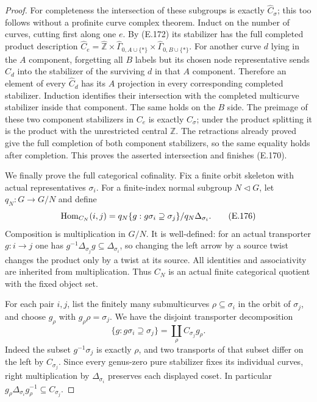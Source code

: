 \begin{proof}
For completeness the intersection of these subgroups is exactly
$\widehat C_\sigma$; this too follows without a profinite curve
complex theorem.  Induct on the number of curves, cutting first
along one $e$.  By (E.172) its stabilizer has the full completed
product description
$\widehat C_e=\widehat{\mathbb Z}\times
\widehat\Gamma_{0,A\cup\{*\}}\times
\widehat\Gamma_{0,B\cup\{*\}}$.
For another curve $d$ lying in the $A$ component, forgetting
all $B$ labels but its chosen node representative sends $C_d$
into the stabilizer of the surviving $d$ in that $A$ component.
Therefore an element of every $\widehat C_d$ has its $A$
projection in every corresponding completed stabilizer.
Induction identifies their intersection with the completed
multicurve stabilizer inside that component.  The same holds
on the $B$ side.  The preimage of these two component
stabilizers in $C_e$ is exactly $C_\sigma$; under the product
splitting it is the product with the unrestricted central
$\mathbb Z$.  The retractions already proved give the full
completion of both component stabilizers, so the same equality
holds after completion.  This proves the asserted intersection
and finishes (E.170).

We finally prove the full categorical cofinality.  Fix a finite
orbit skeleton with actual representatives $\sigma_i$.  For a
finite-index normal subgroup $N\lhd G$, let $q_N:G\to G/N$
and define
\[
 \operatorname{Hom}_{C_N}(i,j)=
   q_N\{g:g\sigma_i\supseteq\sigma_j\}/q_N\Delta_{\sigma_i}.
                                                               \tag{E.176}
\]
Composition is multiplication in $G/N$.  It is well-defined:
for an actual transporter $g:i\to j$ one has
$g^{-1}\Delta_{\sigma_j}g\subseteq\Delta_{\sigma_i}$, so
changing the left arrow by a source twist changes the product
only by a twist at its source.  All identities and associativity
are inherited from multiplication.  Thus $C_N$ is an actual
finite categorical quotient with the fixed object set.

For each pair $i,j$, list the finitely many submulticurves
$\rho\subseteq\sigma_i$ in the orbit of $\sigma_j$, and choose
$g_\rho$ with $g_\rho\rho=\sigma_j$.  We have the disjoint
transporter decomposition
\[
 \{g:g\sigma_i\supseteq\sigma_j\}
                 =\coprod_\rho C_{\sigma_j}g_\rho.            \tag{E.177}
\]
Indeed the subset $g^{-1}\sigma_j$ is exactly $\rho$, and two
transports of that subset differ on the left by
$C_{\sigma_j}$.  Since every genus-zero pure stabilizer fixes
its individual curves, right multiplication by
$\Delta_{\sigma_i}$ preserves each displayed coset.  In
particular $g_\rho\Delta_{\sigma_i}g_\rho^{-1}
\subseteq C_{\sigma_j}$.


\end{proof}
